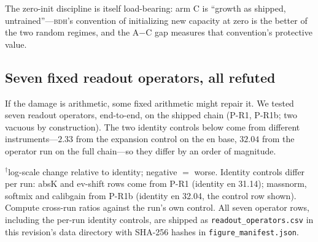 \documentclass[11pt]{article}
\theoremstyle{definition}\newtheorem{definition}{Definition}
\theoremstyle{remark}\newtheorem{remark}{Remark}
\newcommand{\BDH}{\textsc{bdh}}
\begin{document}
The zero-init discipline is itself load-bearing: arm C is ``growth as shipped,
untrained''---\BDH{}'s convention of initializing new capacity at zero is the better of
the two random regimes, and the A$-$C gap measures that convention's protective value.

\subsection{Seven fixed readout operators, all refuted}

If the damage is arithmetic, some fixed arithmetic might repair it. We tested seven
readout operators, end-to-end, on the shipped chain (P-R1, P-R1b; two vacuous by
construction). The two identity controls below come from different instruments---$2.33$ from the expansion control on the en base, $32.04$ from the operator run on the full chain---so they differ by an order of magnitude.

\begin{center}\small
{}
\footnotesize $^\dagger$log-scale change relative to identity; negative $=$ worse. Identity controls differ per run: absK and ev-shift rows come from P-R1 (identity en 31.14); massnorm, softmix and calibgain from P-R1b (identity en 32.04, the control row shown). Compute cross-run ratios against the run's own control. All seven operator rows, including the per-run identity
controls, are shipped as \texttt{readout\_operators.csv} in this revision's data directory
with SHA-256 hashes in \texttt{figure\_manifest.json}.
\end{center}
\end{document}
